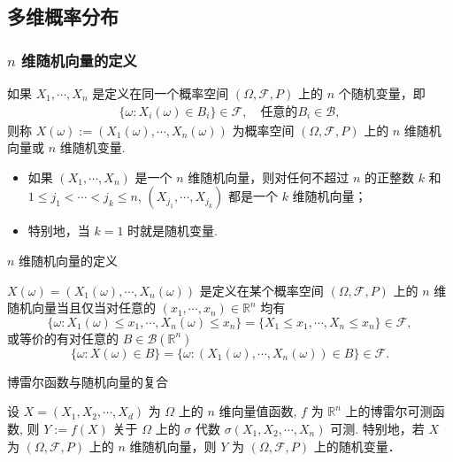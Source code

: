 \documentclass[Prob-All.tex]{subfiles}
\begin{document}
\subsection{多维概率分布}
\begin{frame}
  \frametitle{$n$ 维随机向量的定义}
  \begin{defi}[$n$ 维随机向量或随机变量] 如果 $X_1,\cdots, X_n$ 是定义在同一个概率空间 $(\Omega,\mathcal{F},P)$ 上的 $n$ 个随机变量，即
    \begin{eqnarray*}
      \{\omega:X_i (\omega)\in B_i\}\in \mathcal{F}, \quad \mbox{任意的} B_i\in \mathcal{B},
    \end{eqnarray*}
    则称 $X (\omega):=(X_1 (\omega),\cdots,X_n (\omega))$ 为概率空间 $(\Omega,\mathcal{F},P)$ 上的 $n$ 维随机向量或 $n$ 维随机变量.
  \end{defi}

\vspace{0.2cm}
\begin{rmk}
	\begin{itemize}[<+-|alert@+>]
		\item 如果 $\left (X_1,\cdots ,X_n \right) $ 是一个 $n$ 维随机向量，则对任何不超过 $n$ 的正整数 $k$ 和 $1\leqslant j_1<\cdots <j_k\leqslant n$, $\left ( X_{j_1},\cdots ,X_{j_k} \right) $
		都是一个 $k$ 维随机向量；
		\item 特别地，当 $k=1$ 时就是随机变量.
	\end{itemize}

\end{rmk}

\end{frame}
\begin{frame}{$n$ 维随机向量的定义}


	\begin{thm}
		$X (\omega)=(X_1 (\omega),\cdots,X_n (\omega))$ 是定义在某个概率空间 $(\Omega,\mathcal{F},P)$ 上的 $n$ 维随机向量当且仅当对任意的 $(x_1,\cdots, x_n)\in \mathbb{R}^ n$ 均有
		\[\{\omega: X_1(\omega)\leq x_1,\cdots, X_n(\omega)\leq x_n\}=\{X_1\leq x_1,\cdots, X_n\leq x_n\}\in\mathcal{F},\]
		或等价的有对任意的 $B\in\mathcal{B}(\mathbb{R}^ n)$
		\[\{\omega: X(\omega)\in B\}=\{\omega: (X_1(\omega),\cdots,X_n(\omega))\in B\}\in\mathcal{F}.\]
	\end{thm}


\end{frame}

\begin{frame}{博雷尔函数与随机向量的复合}
\begin{thm}
设 $X=\left(X_{1}, X_{2}, \cdots, X_{d}\right)$ 为 $\Omega$ 上的 $n$ 维向量值函数, $f$ 为 $\mathbb{R}^{n}$ 上的博雷尔可测函数, 则 $Y:=f(X)$ 关于 $\Omega$ 上的 $\sigma$ 代数 $\sigma\left(X_{1}, X_{2}, \cdots, X_{n}\right)$ 可测. 特别地，若 $X$ 为 $(\Omega, \mathcal{F}, P)$ 上的 $n$ 维随机向量，则 $Y$ 为 $(\Omega, \mathcal{F}, P)$ 上的随机变量．
\end{thm}

\end{frame}
\end{document}
